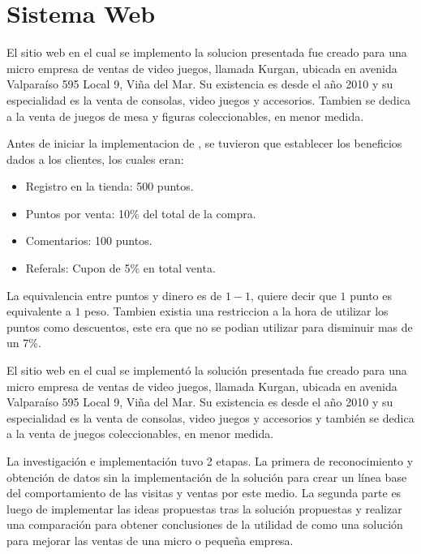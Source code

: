 \section{Sistema Web}


El sitio web en el cual se implemento la solucion presentada fue creado para una micro empresa de
ventas de video juegos, llamada Kurgan, ubicada en avenida Valparaíso 595 Local 9, Viña del Mar.
Su existencia es desde el año 2010 y su especialidad es la venta de consolas, video juegos y
accesorios. Tambien se dedica a la venta de juegos de mesa y figuras coleccionables, en menor medida.

Antes de iniciar la implementacion de {\GAM}, se tuvieron que establecer los beneficios dados a los 
clientes, los cuales eran:

\begin{itemize}

\item Registro en la tienda: 500 puntos.
\item Puntos por venta: 10\% del total de la compra.
\item Comentarios: 100 puntos.
\item Referals: Cupon de 5\% en total venta.

\end{itemize}

La equivalencia entre puntos y dinero es de $1-1$, quiere decir que $1$ punto es equivalente a 
$1$ peso. Tambien existia una restriccion a la hora de utilizar los puntos como descuentos, este 
era que no se podian utilizar para disminuir mas de un 7\%.

El sitio web en el cual se implementó la solución presentada fue creado para una
micro empresa de ventas de video juegos, llamada Kurgan,
ubicada en avenida Valparaíso 595 Local 9, Viña del Mar.
Su existencia es desde el año 2010 y su especialidad es la venta de consolas,
video juegos y accesorios y también se dedica a la venta de juegos coleccionables,
en menor medida.

La investigación e implementación tuvo 2 etapas.
La primera de reconocimiento y obtención de datos sin la implementación de la
solución para crear un línea base del comportamiento de las visitas y ventas por
este medio.
La segunda parte es luego de implementar las ideas propuestas tras la solución
propuestas y realizar una comparación para obtener conclusiones de la utilidad de
{\GAM} como una solución para mejorar las ventas de una micro o pequeña empresa.

